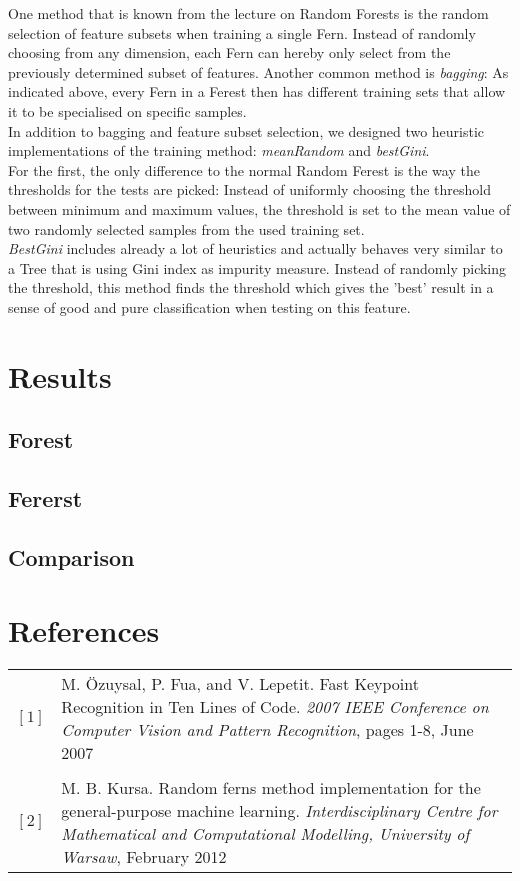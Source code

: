 \documentclass[twocolumn]{article}
\begin{document}
One method that is known from the lecture on Random Forests is the random selection of feature subsets when training a single Fern. Instead of randomly choosing from any dimension, each Fern can hereby only select from the previously determined subset of features. Another common method is \textit{bagging}: As indicated above, every Fern in a Ferest then has different training sets that allow it to be specialised on specific samples.\\
In addition to bagging and feature subset selection, we designed two heuristic implementations of the training method: \textit{meanRandom} and \textit{bestGini}.\\
For the first, the only difference to the normal Random Ferest is the way the thresholds for the tests are picked: Instead of uniformly choosing the threshold between minimum and maximum values, the threshold is set to the mean value of two randomly selected samples from the used training set.\\
\textit{BestGini} includes already a lot of heuristics and actually behaves very similar to a Tree that is using Gini index as impurity measure. Instead of randomly picking the threshold, this method finds the threshold which gives the 'best' result in a sense of good and pure classification when testing on this feature.


\section{Results}

\subsection{Forest}

\subsection{Fererst}

\subsection{Comparison}


\onecolumn
\section*{References}

\begin{tabular}{p{1cm}p{11cm}}

$[1]$ & M. \"Ozuysal, P. Fua, and V. Lepetit. Fast Keypoint Recognition in Ten Lines of Code. \textit{2007 IEEE Conference on Computer Vision and Pattern Recognition}, pages 1-8, June 2007\\
 & \\
$[2]$ & M. B. Kursa. Random ferns method implementation for the general-purpose machine learning. \textit{Interdisciplinary Centre for Mathematical and Computational Modelling, University of Warsaw}, February 2012

\end{tabular}
\end{document}
